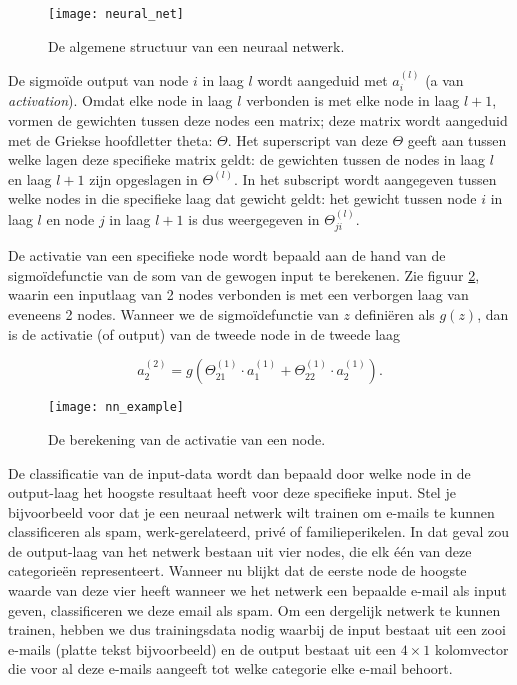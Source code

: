 \begin{figure}[h]
\centering
\texttt{[image: neural\_net]}
\caption{De algemene structuur van een neuraal netwerk.\label{img:neural_net}}
\end{figure}

De sigmoïde output van node $i$ in laag $l$ wordt aangeduid met $a^{(l)}_i$ (a van \textit{activation}). Omdat elke node in laag $l$ verbonden is met elke node in laag $l+1$, vormen de gewichten tussen deze nodes een matrix; deze matrix wordt aangeduid met de Griekse hoofdletter theta: $\Theta$. Het superscript van deze $\Theta$ geeft aan tussen welke lagen deze specifieke matrix geldt: de gewichten tussen de nodes in laag $l$ en laag $l+1$ zijn opgeslagen in $\Theta^{(l)}$. In het subscript wordt aangegeven tussen welke nodes in die specifieke laag dat gewicht geldt: het gewicht tussen node $i$ in laag $l$ en node $j$ in laag $l+1$ is dus weergegeven in $\Theta^{(l)}_{ji}$. 

De activatie van een specifieke node wordt bepaald aan de hand van de sigmoïdefunctie van de som van de gewogen input te berekenen. Zie figuur \ref{img:nn_example}, waarin een inputlaag van 2 nodes verbonden is met een verborgen laag van eveneens 2 nodes. Wanneer we de sigmoïdefunctie van $z$ definiëren als $g(z)$, dan is de activatie (of output) van de tweede node in de tweede laag

\[
a^{(2)}_2 = g(\Theta^{(1)}_{21} \cdot a^{(1)}_1 + \Theta^{(1)}_{22} \cdot a^{(1)}_2).
\]

\begin{figure}[h]
\centering
\texttt{[image: nn\_example]}
\caption{De berekening van de activatie van een node.\label{img:nn_example}}
\end{figure}

De classificatie van de input-data wordt dan bepaald door welke node in de output-laag het hoogste resultaat heeft voor deze specifieke input. Stel je bijvoorbeeld voor dat je een neuraal netwerk wilt trainen om e-mails te kunnen classificeren als spam, werk-gerelateerd, privé of familieperikelen. In dat geval zou de output-laag van het netwerk bestaan uit vier nodes, die elk één van deze categorieën representeert. Wanneer nu blijkt dat de eerste node de hoogste waarde van deze vier heeft wanneer we het netwerk een bepaalde e-mail als input geven, classificeren we deze email als spam. Om een dergelijk netwerk te kunnen trainen, hebben we dus trainingsdata nodig waarbij de input bestaat uit een zooi e-mails (platte tekst bijvoorbeeld) en de output bestaat uit een $4 \times 1$ kolomvector die voor al deze e-mails aangeeft tot welke categorie elke e-mail behoort.

